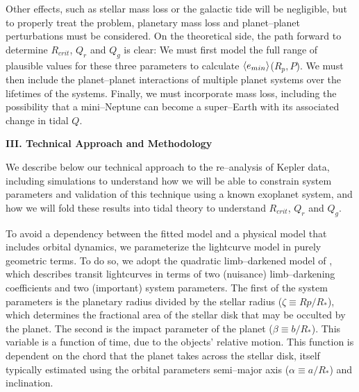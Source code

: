 Other effects, such as stellar mass loss or the galactic tide will be
negligible, but to properly treat the problem, planetary mass loss and
planet--planet perturbations must be considered.  On the theoretical
side, the path forward to determine $R_{crit}$, $Q_{r}$ and $Q_{g}$ is
clear: We must first model the full range of plausible values for
these three parameters to calculate $\left< e_{min} \right>$($R_p,P$).  We must
then include the planet--planet interactions of multiple planet
systems over the lifetimes of the systems.  Finally, we must
incorporate mass loss, including the possibility that a mini--Neptune
can become a super--Earth with its associated change in tidal $Q$.

\bigskip
\centerline{\bf III. Technical Approach and Methodology}
\smallskip

%
%

We describe below our technical approach to the re--analysis of Kepler
data, including simulations to understand how we will be able to
constrain system parameters and validation of this technique using a
known exoplanet system, and how we will fold these results into tidal
theory to understand $R_{crit}$, $Q_{r}$ and $Q_{g}$.

\medskip
{\centerline{}}
\smallskip

To avoid a dependency between the fitted model and a physical model
that includes orbital dynamics, we parameterize the lightcurve model
in purely geometric terms.  To do so, we adopt the quadratic
limb--darkened model of \cite{2002ApJ...580L.171M}, which describes
transit lightcurves in terms of two (nuisance) limb--darkening
coefficients and two (important) system parameters.  The first of the
system parameters is the planetary radius divided by the stellar
radius ($\zeta \equiv Rp/R_*$), which determines the fractional area
of the stellar disk that may be occulted by the planet.  The second is
the impact parameter of the planet ($\beta \equiv b/R_*$).  This
variable is a function of time, due to the objects' relative motion.
This function is dependent on the chord that the planet takes across
the stellar disk, itself typically estimated using the orbital
parameters semi--major axis ($\alpha \equiv a/R_*$) and inclination.

